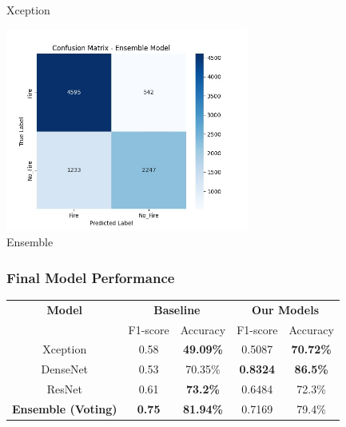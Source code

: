 \begin{frame}
\begin{minipage}[c]{0.5\textwidth}
        Xception
    \end{minipage}%
    \begin{minipage}[c]{0.5\textwidth}
        \centering
        \includegraphics[width=0.6\textwidth]{images/ensemble}\\
        Ensemble
    \end{minipage}
\end{frame}

\begin{frame}
    \frametitle{Final Model Performance}
    \begin{center}
        \renewcommand{\arraystretch}{1.2}
        \begin{tabular}{|c|c|c|c|c|}
            \hline
            \textbf{Model} & \multicolumn{2}{c|}{\textbf{Baseline}} & \multicolumn{2}{c|}{\textbf{Our Models}} \\
            \cline{2-5}
            & F1-score & Accuracy & F1-score & Accuracy \\
            \hline
            Xception & 0.58 & \textbf{49.09\%} & 0.5087 & \textbf{70.72\%} \\
            DenseNet & 0.53 & 70.35\% & \textbf{0.8324} & \textbf{86.5\%} \\
            ResNet & 0.61 & \textbf{73.2\%} & 0.6484 & 72.3\% \\
            \hline
            \textbf{Ensemble (Voting)} & \textbf{0.75} & \textbf{81.94\%} & 0.7169 & 79.4\% \\
            \hline
        \end{tabular}
    \end{center}
\end{frame}
